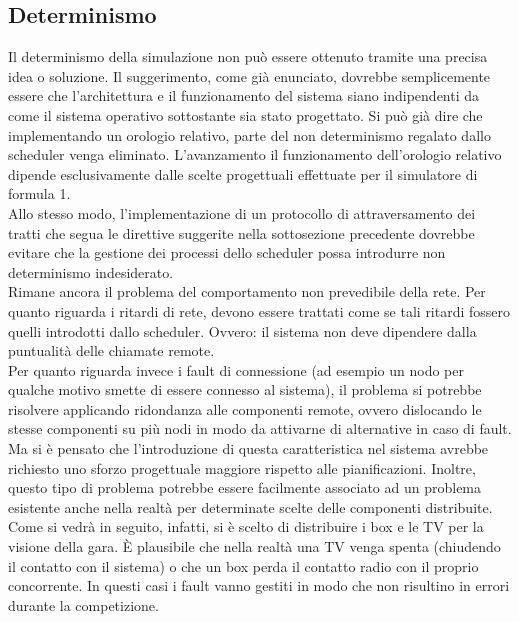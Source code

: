 \subsection{Determinismo} 
Il determinismo della simulazione non può essere ottenuto tramite una precisa
idea o soluzione. Il suggerimento, come già enunciato,
dovrebbe semplicemente essere che l'architettura e il funzionamento del sistema
siano indipendenti da come il sistema operativo
sottostante sia stato progettato. Si può già dire che implementando un orologio
relativo, parte del non determinismo regalato dallo scheduler
venga eliminato. L'avanzamento il funzionamento dell'orologio relativo dipende
esclusivamente dalle scelte progettuali effettuate per 
il simulatore di formula 1.\\
Allo stesso modo, l'implementazione di un protocollo di attraversamento dei
tratti che segua le direttive suggerite nella sottosezione precedente
dovrebbe evitare che la gestione dei processi dello scheduler possa introdurre
non determinismo indesiderato.\\
Rimane ancora il problema del comportamento non prevedibile della rete. Per
quanto riguarda i ritardi di rete, devono essere trattati come
se tali ritardi fossero quelli introdotti dallo scheduler. Ovvero: il sistema
non deve dipendere dalla puntualità delle chiamate remote.\\
Per quanto riguarda invece i fault di connessione (ad esempio un nodo per
qualche motivo smette di essere connesso al sistema), il problema 
si potrebbe risolvere applicando ridondanza alle componenti remote, ovvero
dislocando le stesse componenti su più nodi in modo da attivarne
di alternative in caso di fault. Ma si è pensato che l'introduzione di questa
caratteristica nel sistema avrebbe richiesto uno sforzo progettuale
maggiore rispetto alle pianificazioni. Inoltre, questo tipo di problema potrebbe
essere facilmente associato ad un problema esistente anche nella
realtà per determinate scelte delle componenti distribuite. Come si vedrà in
seguito, infatti, si è scelto di distribuire i box e le TV per
la visione della gara. \`{E} plausibile che nella realtà una TV venga spenta
(chiudendo il contatto con il sistema) o che un box perda
il contatto radio con il proprio concorrente. In questi casi i fault vanno
gestiti in modo che non risultino in errori durante la competizione.
